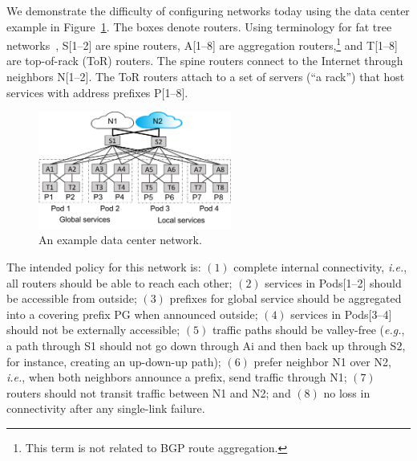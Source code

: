 \documentclass[numbers, 10pt, preprint]{sigplanconf}
\newcommand{\todo}[1]{\textcolor{red}{[TODO: #1]}}
\newcommand{\EG}{\emph{e.g.}}
\newcommand{\IE}{\emph{i.e.}}
\begin{document}
We demonstrate the difficulty of configuring networks today using the data center example in Figure~\ref{fig:example}. The boxes denote routers. Using terminology for fat tree networks~\cite{fattree}, S[1--2] are spine routers, A[1--8] are aggregation routers,\footnote{This term is not related to BGP route aggregation.} and T[1--8] are top-of-rack (ToR) routers. The spine routers connect to the Internet through neighbors N[1--2].
The ToR routers attach to a set of servers (``a rack'') that host services with address prefixes P[1--8].



\begin{figure}[t!]
  \centering
  \includegraphics[width=2.5in]{figures/example}
  \vspace{-.8em}
  \caption{An example data center network.}
  \label{fig:example}
  \vspace{-.8em}
\end{figure}

The intended policy for this network is:
$(1)$ complete internal connectivity, \IE, all routers should be able to reach each other;
$(2)$ services in Pods[1--2] should be accessible from outside;
$(3)$ prefixes for global service should be aggregated into a covering prefix PG when announced outside;
$(4)$ services in Pods[3--4] should not be externally accessible;
$(5)$ traffic paths should be valley-free (\EG, a path through S1 should
not go down through Ai and then back up through S2, for instance, 
creating an up-down-up path);
$(6)$ prefer neighbor N1 over N2, \IE, when both neighbors announce a prefix, send traffic through N1;
$(7)$ routers should not transit traffic between N1 and N2; and
$(8)$ no loss in connectivity after any single-link failure.
\end{document}
